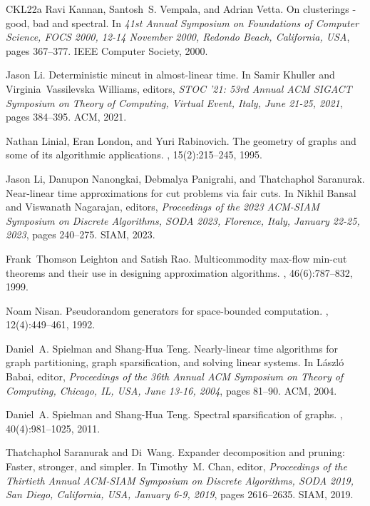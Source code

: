 \documentclass[epsfig,letter,11pt]{article}
\numberwithin{equation}{section}
\begin{document}
\begin{thebibliography}{CKL{\etalchar{+}}22a}
Ravi Kannan, Santosh~S. Vempala, and Adrian Vetta.
\newblock On clusterings - good, bad and spectral.
\newblock In {\em 41st Annual Symposium on Foundations of Computer Science,
  {FOCS} 2000, 12-14 November 2000, Redondo Beach, California, {USA}}, pages
  367--377. {IEEE} Computer Society, 2000.

Jason Li.
\newblock Deterministic mincut in almost-linear time.
\newblock In Samir Khuller and Virginia~Vassilevska Williams, editors, {\em
  {STOC} '21: 53rd Annual {ACM} {SIGACT} Symposium on Theory of Computing,
  Virtual Event, Italy, June 21-25, 2021}, pages 384--395. {ACM}, 2021.

Nathan Linial, Eran London, and Yuri Rabinovich.
\newblock The geometry of graphs and some of its algorithmic applications.
, 15(2):215--245, 1995.

Jason Li, Danupon Nanongkai, Debmalya Panigrahi, and Thatchaphol Saranurak.
\newblock Near-linear time approximations for cut problems via fair cuts.
\newblock In Nikhil Bansal and Viswanath Nagarajan, editors, {\em Proceedings
  of the 2023 {ACM-SIAM} Symposium on Discrete Algorithms, {SODA} 2023,
  Florence, Italy, January 22-25, 2023}, pages 240--275. {SIAM}, 2023.

Frank~Thomson Leighton and Satish Rao.
\newblock Multicommodity max-flow min-cut theorems and their use in designing
  approximation algorithms.
, 46(6):787--832, 1999.

Noam Nisan.
\newblock Pseudorandom generators for space-bounded computation.
, 12(4):449--461, 1992.

Daniel~A. Spielman and Shang{-}Hua Teng.
\newblock Nearly-linear time algorithms for graph partitioning, graph
  sparsification, and solving linear systems.
\newblock In L{\'{a}}szl{\'{o}} Babai, editor, {\em Proceedings of the 36th
  Annual {ACM} Symposium on Theory of Computing, Chicago, IL, USA, June 13-16,
  2004}, pages 81--90. {ACM}, 2004.

Daniel~A. Spielman and Shang{-}Hua Teng.
\newblock Spectral sparsification of graphs.
, 40(4):981--1025, 2011.

Thatchaphol Saranurak and Di~Wang.
\newblock Expander decomposition and pruning: Faster, stronger, and simpler.
\newblock In Timothy~M. Chan, editor, {\em Proceedings of the Thirtieth Annual
  {ACM-SIAM} Symposium on Discrete Algorithms, {SODA} 2019, San Diego,
  California, USA, January 6-9, 2019}, pages 2616--2635. {SIAM}, 2019.


\end{thebibliography}
\end{document}

